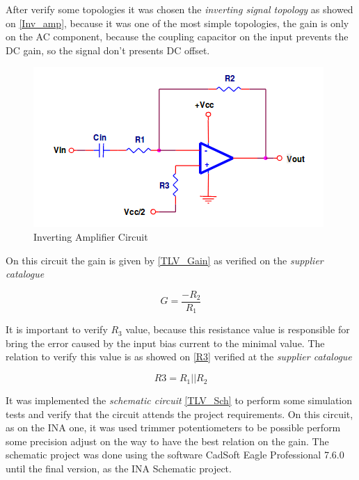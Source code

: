 After verify some topologies it was chosen the \textit{inverting signal topology} \cite{OpAmps} as showed on \autoref{Inv_amp}, because it was one of the most simple topologies, the
gain is only on the AC component, because the coupling capacitor on the input prevents the DC gain, so the signal don't presents
DC offset.

\begin{figure}[!htpb]
\centering
\caption{Inverting Amplifier Circuit}
\label{Inv_amp}
\includegraphics[scale=1]{images/TLV_Gain}
\end{figure}

On this circuit the gain is given by \autoref{TLV_Gain} as verified on the \textit{supplier catalogue} \cite{OpAmps}

\begin{equation}
\label{TLV_Gain}
G=\frac{-R_2}{R_1}
\end{equation}

It is important to verify $R_3$ value, because this resistance value is responsible for bring the error caused by the
input bias current to the minimal value. The relation to verify this value is as showed on \autoref{R3} verified at
the \textit{supplier catalogue} \cite{OpAmps}

\begin{equation}
\label{R3}
R3=R_1||R_2
\end{equation}

It was implemented the \textit{schematic circuit} \autoref{TLV_Sch} to perform some simulation tests and verify that the circuit attends the project
requirements. On this circuit, as on the INA one, it was used trimmer potentiometers to be possible perform some precision adjust on the way to have
the best relation on the gain. The schematic project was done using the software CadSoft Eagle Professional 7.6.0 until the final version, as the INA
Schematic project.

